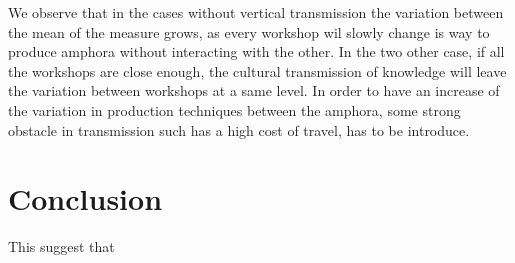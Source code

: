 \documentclass[a4paper]{article}
\begin{document}
    We observe that in the cases without vertical transmission the variation between the mean of the measure grows, as every workshop wil slowly change is way to produce amphora without interacting with the other. In the two other case, if all the workshops are close enough, the cultural transmission of knowledge will leave the variation between workshops at a same level. In order to have an increase of the variation in production techniques between the amphora, some strong obstacle in transmission such has a high cost of travel, has to be introduce.

    \section{Conclusion}
    
    This suggest that
 


%
%
%
%
\end{document}
